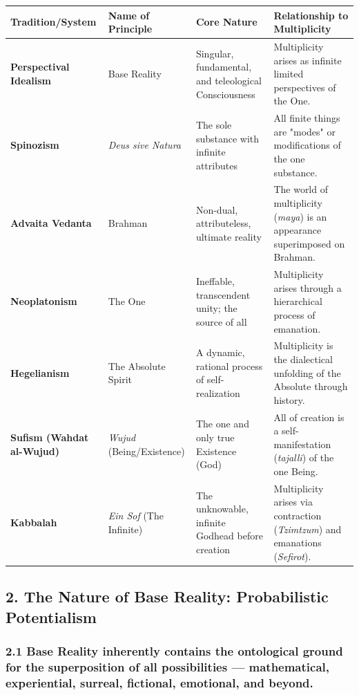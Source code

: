 \begin{longtable}{>{\raggedright\arraybackslash}p{} >{\raggedright\arraybackslash}p{} >{\raggedright\arraybackslash}p{} >{\raggedright\arraybackslash}p{}}
\toprule
\textbf{Tradition/\allowbreak System} & \textbf{Name of Principle} & \textbf{Core Nature} & \textbf{Relationship to Multiplicity} \\
\midrule
\endhead
\textbf{Perspectival Idealism} & Base Reality & Singular, fundamental, and teleological Consciousness & Multiplicity arises as infinite limited perspectives of the One. \\
\textbf{Spinozism} & \textit{Deus sive Natura} & The sole substance with infinite attributes & All finite things are "modes" or modifications of the one substance. \\
\textbf{Advaita Vedanta} & Brahman & Non-dual, attributeless, ultimate reality & The world of multiplicity (\textit{maya}) is an appearance superimposed on Brahman. \\
\textbf{Neoplatonism} & The One & Ineffable, transcendent unity; the source of all & Multiplicity arises through a hierarchical process of emanation. \\
\textbf{Hegelianism} & The Absolute Spirit & A dynamic, rational process of self-realization & Multiplicity is the dialectical unfolding of the Absolute through history. \\
\textbf{Sufism (Wahdat al-Wujud)} & \textit{Wujud} (Being/\allowbreak Existence) & The one and only true Existence (God) & All of creation is a self-manifestation (\textit{tajalli}) of the one Being. \\
\textbf{Kabbalah} & \textit{Ein Sof} (The Infinite) & The unknowable, infinite Godhead before creation & Multiplicity arises via contraction (\textit{Tzimtzum}) and emanations (\textit{Sefirot}). \\
\bottomrule
\end{longtable}



\bigskip\noindent\makebox[\textwidth]{\color{rulegray}\rule{5cm}{0.3pt}}\bigskip


\subsection*{2. The Nature of Base Reality: Probabilistic Potentialism}


\subsubsection*{2.1 Base Reality inherently contains the ontological ground for the superposition of all possibilities — mathematical, experiential, surreal, fictional, emotional, and beyond.}


